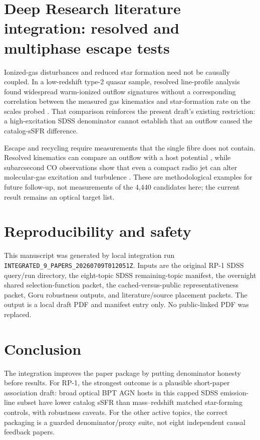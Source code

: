 \documentclass[twocolumn]{aastex702}
\begin{document}
\section{Deep Research literature integration: resolved and multiphase escape tests}\label{sec:dr-r1}
Ionized-gas disturbances and reduced star formation need not be causally coupled. In a low-redshift type-2 quasar sample, resolved line-profile analysis found widespread warm-ionized outflow signatures without a corresponding correlation between the measured gas kinematics and star-formation rate on the scales probed \citep{bessiere2024}. That comparison reinforces the present draft's existing restriction: a high-excitation SDSS denominator cannot establish that an outflow caused the catalog-sSFR difference.

Escape and recycling require measurements that the single fibre does not contain. Resolved kinematics can compare an outflow with a host potential \citep{zheng2023}, while subarcsecond CO observations show that even a compact radio jet can alter molecular-gas excitation and turbulence \citep{audibert2023}. These are methodological examples for future follow-up, not measurements of the 4,440 candidates here; the current result remains an optical target list.

\section{Reproducibility and safety}\label{sec:repro}
This manuscript was generated by local integration run \texttt{INTEGRATED\_9\_PAPERS\_20260709T012051Z}. Inputs are the original RP-1 SDSS query/run directory, the eight-topic SDSS remaining-topic manifest, the overnight shared selection-function packet, the cached-versus-public representativeness packet, Goru robustness outputs, and literature/source placement packets. The output is a local draft PDF and manifest entry only. No public-linked PDF was replaced.

\section{Conclusion}\label{sec:conclusion}
The integration improves the paper package by putting denominator honesty before results. For RP-1, the strongest outcome is a plausible short-paper association draft: broad optical BPT AGN hosts in this capped SDSS emission-line subset have lower catalog sSFR than mass--redshift matched star-forming controls, with robustness caveats. For the other active topics, the correct packaging is a guarded denominator/proxy suite, not eight independent causal feedback papers.
\end{document}
